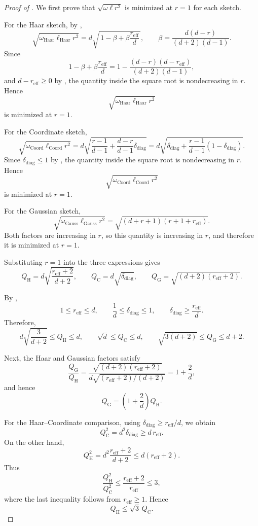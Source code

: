 \documentclass[10pt]{article}
\begin{document}
\begin{proof}[Proof of ]
We first prove that \(\sqrt{\omega\ell r^2}\) is minimized at \(r=1\) for each sketch.

For the Haar sketch, by ,
\[
\sqrt{\omega_{\mathrm{Haar}}\ell_{\mathrm{Haar}}r^2}
=
d\sqrt{\,1-\beta+\beta\frac{r_{\mathrm{eff}}}{d}\,},
\qquad
\beta=\frac{d(d-r)}{(d+2)(d-1)}.
\]
Since
\[
1-\beta+\beta\frac{r_{\mathrm{eff}}}{d}
=
1-\frac{(d-r)(d-r_{\mathrm{eff}})}{(d+2)(d-1)},
\]
and \(d-r_{\mathrm{eff}}\ge 0\) by , the quantity inside the square root is nondecreasing in \(r\). Hence
\[
\sqrt{\omega_{\mathrm{Haar}}\ell_{\mathrm{Haar}}r^2}
\]
is minimized at \(r=1\).

For the Coordinate sketch,
\[
\sqrt{\omega_{\mathrm{Coord}}\ell_{\mathrm{Coord}}r^2}
=
d\sqrt{\frac{r-1}{d-1}+\frac{d-r}{d-1}\delta_{\mathrm{diag}}}
=
d\sqrt{\delta_{\mathrm{diag}}+\frac{r-1}{d-1}(1-\delta_{\mathrm{diag}})}.
\]
Since \(\delta_{\mathrm{diag}}\le 1\) by , the quantity inside the square root is nondecreasing in \(r\). Hence
\[
\sqrt{\omega_{\mathrm{Coord}}\ell_{\mathrm{Coord}}r^2}
\]
is minimized at \(r=1\).

For the Gaussian sketch,
\[
\sqrt{\omega_{\mathrm{Gauss}}\ell_{\mathrm{Gauss}}r^2}
=
\sqrt{(d+r+1)(r+1+r_{\mathrm{eff}})}.
\]
Both factors are increasing in \(r\), so this quantity is increasing in \(r\), and therefore it is minimized at \(r=1\).

Substituting \(r=1\) into the three expressions gives
\[
Q_{\mathrm H}
= d\sqrt{\frac{r_{\mathrm{eff}}+2}{d+2}},
\qquad
Q_{\mathrm C}
= d\sqrt{\delta_{\mathrm{diag}}},
\qquad
Q_{\mathrm G}
= \sqrt{(d+2)(r_{\mathrm{eff}}+2)}.
\]

By ,
\[
1\le r_{\mathrm{eff}}\le d,
\qquad
\frac1d\le \delta_{\mathrm{diag}}\le1,
\qquad
\delta_{\mathrm{diag}}\ge \frac{r_{\mathrm{eff}}}{d}.
\]
Therefore,
\[
d\sqrt{\frac{3}{d+2}}
\le Q_{\mathrm H}\le d,
\qquad
\sqrt d\le Q_{\mathrm C}\le d,
\qquad
\sqrt{3(d+2)}\le Q_{\mathrm G}\le d+2.
\]

Next, the Haar and Gaussian factors satisfy
\[
\frac{Q_{\mathrm G}}{Q_{\mathrm H}}
=
\frac{\sqrt{(d+2)(r_{\mathrm{eff}}+2)}}
{d\sqrt{(r_{\mathrm{eff}}+2)/(d+2)}}
=
1+\frac{2}{d},
\]
and hence
\[
Q_{\mathrm G}=\left(1+\frac{2}{d}\right)Q_{\mathrm H}.
\]

For the Haar--Coordinate comparison, using
\(\delta_{\mathrm{diag}}\ge r_{\mathrm{eff}}/d\), we obtain
\[
Q_{\mathrm C}^2
=
d^2\delta_{\mathrm{diag}}
\ge
d\,r_{\mathrm{eff}}.
\]
On the other hand,
\[
Q_{\mathrm H}^2
=
d^2\frac{r_{\mathrm{eff}}+2}{d+2}
\le
d(r_{\mathrm{eff}}+2).
\]
Thus
\[
\frac{Q_{\mathrm H}^2}{Q_{\mathrm C}^2}
\le
\frac{r_{\mathrm{eff}}+2}{r_{\mathrm{eff}}}
\le 3,
\]
where the last inequality follows from \(r_{\mathrm{eff}}\ge1\). Hence
\[
Q_{\mathrm H}\le \sqrt3\,Q_{\mathrm C}.
\]


\end{proof}
\end{document}
